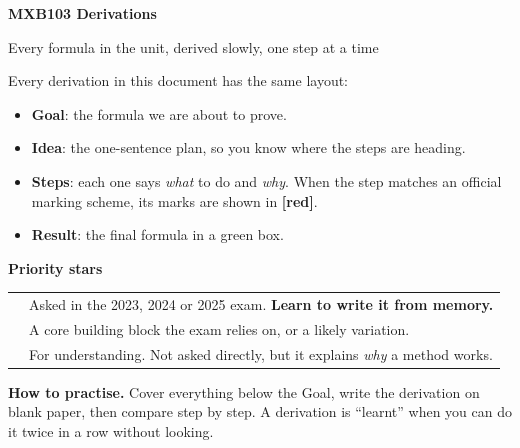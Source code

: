 \documentclass[11pt,a4paper]{article}
\newcommand{\sthree}{\textcolor{edge}{\ding{72}\ding{72}\ding{72}}}
\newcommand{\stwo}{\textcolor{rem}{\ding{72}\ding{72}}}
\newcommand{\sone}{\textcolor{muted}{\ding{72}}}
\newcommand{\mk}[1]{\textcolor{edge}{\textbf{[#1]}}}
\begin{document}
\thispagestyle{plain}
{\color{accent}\huge\bfseries MXB103 Derivations\par}
\vspace{2pt}
{\Large\color{muted} Every formula in the unit, derived slowly, one step at a time\par}
\vspace{10pt}

Every derivation in this document has the same layout:

\begin{itemize}[leftmargin=16pt,itemsep=2pt]
\item \textbf{Goal}: the formula we are about to prove.
\item \textbf{Idea}: the one-sentence plan, so you know where the steps are heading.
\item \textbf{Steps}: each one says \emph{what} to do and \emph{why}. When the step matches an official marking scheme, its marks are shown in \mk{red}.
\item \textbf{Result}: the final formula in a green box.
\end{itemize}

\textbf{Priority stars}
\begin{center}
\begin{tabular}{ll}
\toprule
\sthree & Asked in the 2023, 2024 or 2025 exam. \textbf{Learn to write it from memory.}\\
\stwo & A core building block the exam relies on, or a likely variation.\\
\sone & For understanding. Not asked directly, but it explains \emph{why} a method works.\\
\bottomrule
\end{tabular}
\end{center}

\textbf{How to practise.} Cover everything below the Goal, write the derivation on blank paper, then compare step by step. A derivation is ``learnt'' when you can do it twice in a row without looking.
\end{document}
